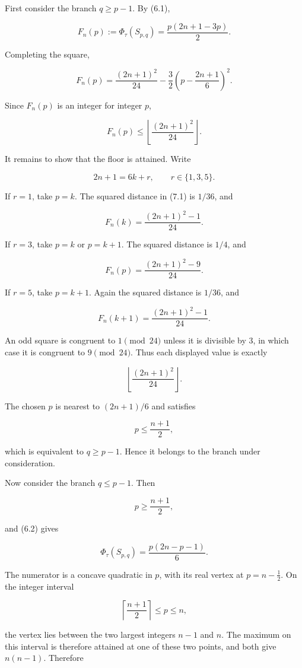 \documentclass[english,11pt,a4paper]{article}
\begin{document}
First consider the branch \(q\ge p-1\). By (6.1),

\[
F_n(p)
:=
\Phi_\tau(S_{p,q})
=
\frac{p(2n+1-3p)}2.
\]

Completing the square,

\[
F_n(p)
=
\frac{(2n+1)^2}{24}
-
\frac32
\left(
p-\frac{2n+1}{6}
\right)^2.
\tag{7.1}
\]

Since \(F_n(p)\) is an integer for integer \(p\),

\[
F_n(p)
\le
\left\lfloor\frac{(2n+1)^2}{24}\right\rfloor.
\]

It remains to show that the floor is attained. Write

\[
2n+1=6k+r,
\qquad
r\in\{1,3,5\}.
\]

If \(r=1\), take \(p=k\). The squared distance in (7.1) is \(1/36\), and

\[
F_n(k)
=
\frac{(2n+1)^2-1}{24}.
\]

If \(r=3\), take \(p=k\) or \(p=k+1\). The squared distance is \(1/4\),
and

\[
F_n(p)
=
\frac{(2n+1)^2-9}{24}.
\]

If \(r=5\), take \(p=k+1\). Again the squared distance is \(1/36\), and

\[
F_n(k+1)
=
\frac{(2n+1)^2-1}{24}.
\]

An odd square is congruent to \(1\pmod{24}\) unless it is divisible by
\(3\), in which case it is congruent to \(9\pmod{24}\). Thus each
displayed value is exactly

\[
\left\lfloor\frac{(2n+1)^2}{24}\right\rfloor.
\]

The chosen \(p\) is nearest to \((2n+1)/6\) and satisfies

\[
p\le\frac{n+1}{2},
\]

which is equivalent to \(q\ge p-1\). Hence it belongs to the branch
under consideration.

Now consider the branch \(q\le p-1\). Then

\[
p\ge\frac{n+1}{2},
\]

and (6.2) gives

\[
\Phi_\tau(S_{p,q})
=
\frac{p(2n-p-1)}6.
\]

The numerator is a concave quadratic in \(p\), with its real vertex at
\(p=n-\tfrac12\). On the integer interval

\[
\left\lceil\frac{n+1}{2}\right\rceil
\le p\le n,
\]

the vertex lies between the two largest integers \(n-1\) and \(n\). The
maximum on this interval is therefore attained at one of these two
points, and both give \(n(n-1)\). Therefore
\end{document}
